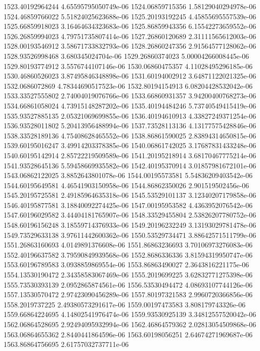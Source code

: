 {1523.40192964244 4.65595795050749e-06
1524.06859715356 1.58129040294978e-06
1524.46859766022 5.51824025623688e-06
1525.20193192245 4.45855695557539e-06
1525.66859918023 3.16464634323683e-06
1525.86859943356 6.15542273659552e-06
1526.26859994023 4.79751735807414e-06
1527.26860120689 2.31111565612003e-06
1528.00193546912 3.58671733832793e-06
1528.26860247356 2.91564577128062e-06
1528.93526998468 3.680345024704e-06
1529.26860374023 5.00004266008445e-06
1529.80193774912 3.5576744107146e-06
1530.06860475357 4.11028495296185e-06
1530.46860526023 3.87495846348898e-06
1531.60194002912 3.64871122021325e-06
1532.0686072869 4.78344690517523e-06
1532.80194154913 6.08204428532042e-06
1533.33527555802 2.74004019076766e-06
1533.66860931357 3.94200400768273e-06
1534.66861058024 4.73915148287202e-06
1535.40194484246 5.73740549415419e-06
1535.93527885135 2.05321069699855e-06
1536.40194610913 4.33827249371254e-06
1536.93528011802 5.20413956488994e-06
1537.73528113136 4.13177575428846e-06
1538.33528189136 4.75408628465552e-06
1538.86861590025 2.83894314650815e-06
1539.60195016247 3.49914203378385e-06
1540.06861742025 3.17687831433248e-06
1540.60195142914 2.85722219509589e-06
1541.20195218914 3.68170467775214e-06
1541.93528645136 5.59458669935582e-06
1542.40195370914 3.01857981672101e-06
1543.06862122025 3.8852643801078e-06
1544.00195573581 5.54836209403542e-06
1544.60195649581 4.46541903150958e-06
1544.86862350026 2.901519502456e-06
1545.20195725581 2.49185964635318e-06
1545.53529101137 3.12340207179858e-06
1546.40195877581 3.18840092274425e-06
1547.00195953582 4.4363952076542e-06
1547.60196029582 3.44404181765907e-06
1548.33529455804 2.53826207780752e-06
1548.60196156248 3.18559714376933e-06
1549.20196232249 3.13193029781478e-06
1549.73529633138 3.97611442600362e-06
1550.53529734471 3.88642571511799e-06
1551.26863160693 4.0149891376608e-06
1551.86863236693 3.70106973276083e-06
1552.40196637582 3.79590849939568e-06
1552.8686336336 3.81594319950747e-06
1553.60196789583 3.0938859869554e-06
1553.86863490027 2.3643816221175e-06
1554.13530190472 2.34358583067469e-06
1555.2019699225 3.62832771275398e-06
1555.73530393139 2.0952865874561e-06
1556.53530494472 4.08693107744126e-06
1557.13530570472 2.97423090456289e-06
1557.80197321583 2.9960720366856e-06
1558.2019737225 2.49380573291617e-06
1559.00197473583 3.808179743326e-06
1559.66864224695 4.14802541976474e-06
1559.93530925139 3.34812557520042e-06
1562.06864528695 2.92494095932994e-06
1562.46864579362 2.02813054509868e-06
1563.06864655362 2.8440441864596e-06
1563.60198056251 2.64674271969687e-06
1563.86864756695 2.61757032737711e-06
}
